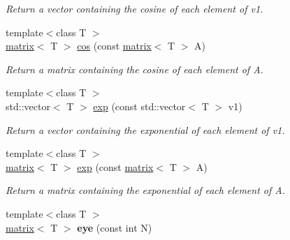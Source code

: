 \begin{DoxyCompactItemize}
\begin{DoxyCompactList}\small\item\em Return a vector containing the cosine of each element of v1. \end{DoxyCompactList}\item 
\hypertarget{namespacekeycpp_a6d906ad1b0afbefd588c619cdb02530a}{{\footnotesize template$<$class T $>$ }\\\hyperlink{classkeycpp_1_1matrix}{matrix}$<$ T $>$ \hyperlink{namespacekeycpp_a6d906ad1b0afbefd588c619cdb02530a}{cos} (const \hyperlink{classkeycpp_1_1matrix}{matrix}$<$ T $>$ A)}\label{namespacekeycpp_a6d906ad1b0afbefd588c619cdb02530a}

\begin{DoxyCompactList}\small\item\em Return a matrix containing the cosine of each element of A. \end{DoxyCompactList}\item 
\hypertarget{namespacekeycpp_aa2d4f2ab79da4b10e9be3af2693904ef}{{\footnotesize template$<$class T $>$ }\\std\-::vector$<$ T $>$ \hyperlink{namespacekeycpp_aa2d4f2ab79da4b10e9be3af2693904ef}{exp} (const std\-::vector$<$ T $>$ v1)}\label{namespacekeycpp_aa2d4f2ab79da4b10e9be3af2693904ef}

\begin{DoxyCompactList}\small\item\em Return a vector containing the exponential of each element of v1. \end{DoxyCompactList}\item 
\hypertarget{namespacekeycpp_a24ac535f72f9e72bf2d0fb93b2b0ee01}{{\footnotesize template$<$class T $>$ }\\\hyperlink{classkeycpp_1_1matrix}{matrix}$<$ T $>$ \hyperlink{namespacekeycpp_a24ac535f72f9e72bf2d0fb93b2b0ee01}{exp} (const \hyperlink{classkeycpp_1_1matrix}{matrix}$<$ T $>$ A)}\label{namespacekeycpp_a24ac535f72f9e72bf2d0fb93b2b0ee01}

\begin{DoxyCompactList}\small\item\em Return a matrix containing the exponential of each element of A. \end{DoxyCompactList}\item 
\hypertarget{namespacekeycpp_a90a6f9aaec03f1f72bf4013316795c5f}{{\footnotesize template$<$class T $>$ }\\\hyperlink{classkeycpp_1_1matrix}{matrix}$<$ T $>$ {\bfseries eye} (const int N)}\label{namespacekeycpp_a90a6f9aaec03f1f72bf4013316795c5f}


\end{DoxyCompactItemize}

